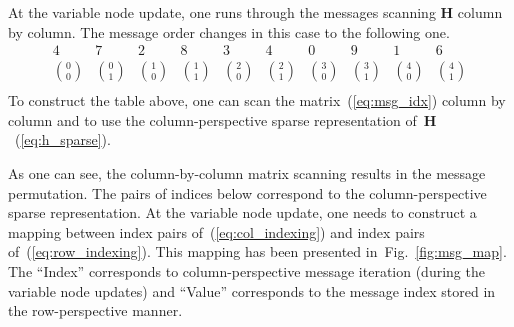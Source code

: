 \documentclass{article}
\begin{document}
At the variable node update, one runs through the messages scanning $\mathbf{H}$ column by column. The message order changes in this case to the following one.
\begin{equation}
\label{eq:col_indexing}
\begin{array}{cccccccccc}
4      & 7      & 2      & 8      & 3      & 4      & 0      & 9      & 1      & 6      \\
{0 \choose 0} & {0 \choose 1} & {1 \choose 0} & {1 \choose 1} & {2 \choose 0} & {2 \choose 1} & {3 \choose 0} & {3 \choose 1} & {4 \choose 0} & {4 \choose 1} \\
\end{array}
\end{equation}
To construct the table above, one can scan the matrix~(\ref{eq:msg_idx}) column by column and to use the column-perspective sparse representation of~$\mathbf{H}$~(\ref{eq:h_sparse}).

As one can see, the column-by-column matrix scanning results in the message permutation. The pairs of indices below correspond to the column-perspective sparse representation. At the variable node update, one needs to construct a mapping between index pairs of~(\ref{eq:col_indexing}) and index pairs of~(\ref{eq:row_indexing}). This mapping has been presented in~Fig.~\ref{fig:msg_map}. The ``Index'' corresponds to column-perspective message iteration (during the variable node updates) and ``Value'' corresponds to the message index stored in the row-perspective manner.
\end{document}
